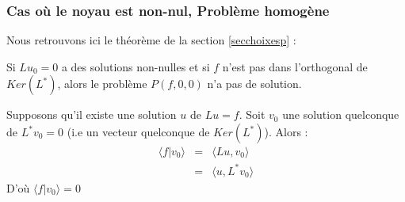 \documentclass[12pt]{book}
\begin{document}
\subsubsection{Cas o\`u le noyau est non-nul, Probl\`eme homog\`ene}
Nous retrouvons ici le th\'eor\`eme de la section \ref{secchoixesp} :
\begin{thm}
Si  $Lu_0=0$ a des solutions non-nulles et si $f$ n'est pas
dans l'orthogonal de $Ker(L^*)$, alors le probl\`eme 
$P(f,0,0)$ n'a pas de
solution.
\end{thm}
\begin{pf}
Supposons qu'il existe une solution $u$ de $Lu=f$. Soit $v_0$ une
solution quelconque de $L^*v_0=0$ (i.e un vecteur quelconque de
$Ker(L^*)$).
Alors :
\begin{eqnarray}
 \langle f|v_0\rangle &=& \langle Lu,v_0\rangle  \nonumber\\
       &=& \langle u,L^*v_0\rangle 
\end{eqnarray} 
D'o\`u $ \langle f|v_0\rangle =0$
\end{pf}
\end{document}

